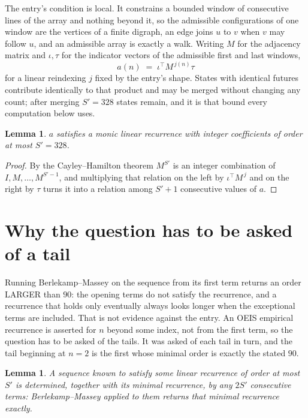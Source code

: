 \documentclass[11pt,a4paper]{article}
\theoremstyle{plain}
\newtheorem{lemma}[theorem]{Lemma}
\theoremstyle{definition}
\begin{document}
The entry's condition is local. It constrains a bounded window of consecutive lines of the
array and nothing beyond it, so the admissible configurations of one window are the vertices of
a finite digraph, an edge joins $u$ to $v$ when $v$ may follow $u$, and an admissible array is
exactly a walk. Writing $M$ for the adjacency matrix and $\iota,\tau$ for the indicator vectors
of the admissible first and last windows,
\[
a(n)\;=\;\iota^{\!\top}M^{\,j(n)}\tau
\]
for a linear reindexing $j$ fixed by the entry's shape. States with identical futures
contribute identically to that product and may be merged without changing any count; after
merging $S'=328$ states remain, and it is that bound every computation below uses.

\begin{lemma}\label{lem:cf}
$a$ satisfies a monic linear recurrence with integer coefficients of order at most $S'=328$.
\end{lemma}

\begin{proof}
By the Cayley--Hamilton theorem $M^{S'}$ is an integer combination of $I,M,\dots,M^{S'-1}$,
and multiplying that relation on the left by $\iota^{\!\top}M^{\,j}$ and on the right by
$\tau$ turns it into a relation among $S'+1$ consecutive values of $a$.
\end{proof}

\section{Why the question has to be asked of a tail}

Running Berlekamp--Massey on the sequence from its first term returns an order LARGER than $90$: the opening terms do not satisfy the recurrence, and a recurrence that holds only eventually always looks longer when the exceptional terms are included. That is not evidence against the entry. An OEIS empirical recurrence is asserted for $n$ beyond some index, not from the first term, so the question has to be asked of the tails. It was asked of each tail in turn, and the tail beginning at $n=2$ is the first whose minimal order is exactly the stated $90$.

\begin{lemma}\label{lem:bm}
A sequence known to satisfy some linear recurrence of order at most $S'$ is determined,
together with its minimal recurrence, by any $2S'$ consecutive terms: Berlekamp--Massey applied
to them returns that minimal recurrence exactly.
\end{lemma}
\end{document}

